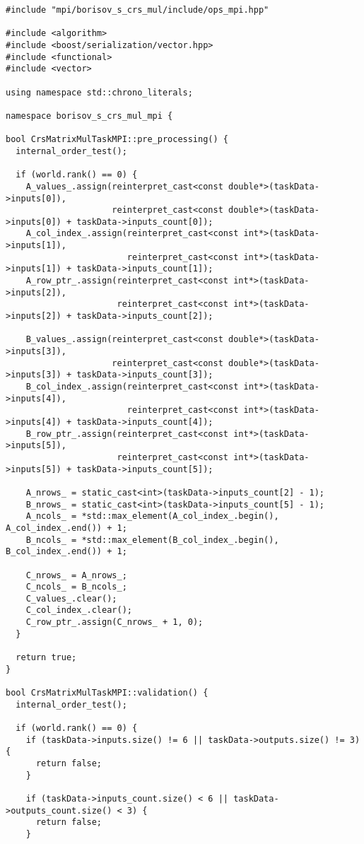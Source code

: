 \documentclass[12pt]{article}
\begin{document}
\begin{lstlisting}
#include "mpi/borisov_s_crs_mul/include/ops_mpi.hpp"

#include <algorithm>
#include <boost/serialization/vector.hpp>
#include <functional>
#include <vector>

using namespace std::chrono_literals;

namespace borisov_s_crs_mul_mpi {

bool CrsMatrixMulTaskMPI::pre_processing() {
  internal_order_test();

  if (world.rank() == 0) {
    A_values_.assign(reinterpret_cast<const double*>(taskData->inputs[0]),
                     reinterpret_cast<const double*>(taskData->inputs[0]) + taskData->inputs_count[0]);
    A_col_index_.assign(reinterpret_cast<const int*>(taskData->inputs[1]),
                        reinterpret_cast<const int*>(taskData->inputs[1]) + taskData->inputs_count[1]);
    A_row_ptr_.assign(reinterpret_cast<const int*>(taskData->inputs[2]),
                      reinterpret_cast<const int*>(taskData->inputs[2]) + taskData->inputs_count[2]);

    B_values_.assign(reinterpret_cast<const double*>(taskData->inputs[3]),
                     reinterpret_cast<const double*>(taskData->inputs[3]) + taskData->inputs_count[3]);
    B_col_index_.assign(reinterpret_cast<const int*>(taskData->inputs[4]),
                        reinterpret_cast<const int*>(taskData->inputs[4]) + taskData->inputs_count[4]);
    B_row_ptr_.assign(reinterpret_cast<const int*>(taskData->inputs[5]),
                      reinterpret_cast<const int*>(taskData->inputs[5]) + taskData->inputs_count[5]);

    A_nrows_ = static_cast<int>(taskData->inputs_count[2] - 1);
    B_nrows_ = static_cast<int>(taskData->inputs_count[5] - 1);
    A_ncols_ = *std::max_element(A_col_index_.begin(), A_col_index_.end()) + 1;
    B_ncols_ = *std::max_element(B_col_index_.begin(), B_col_index_.end()) + 1;

    C_nrows_ = A_nrows_;
    C_ncols_ = B_ncols_;
    C_values_.clear();
    C_col_index_.clear();
    C_row_ptr_.assign(C_nrows_ + 1, 0);
  }

  return true;
}

bool CrsMatrixMulTaskMPI::validation() {
  internal_order_test();

  if (world.rank() == 0) {
    if (taskData->inputs.size() != 6 || taskData->outputs.size() != 3) {
      return false;
    }

    if (taskData->inputs_count.size() < 6 || taskData->outputs_count.size() < 3) {
      return false;
    }


\end{lstlisting}
\end{document}
